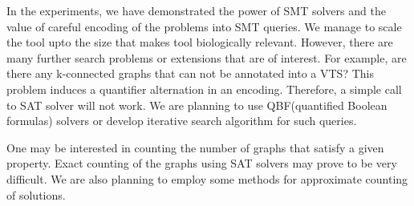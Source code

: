 In the experiments, we have demonstrated the power of SMT solvers and the value
of careful encoding of the problems into SMT queries.
%
We manage to scale the tool upto the size that makes tool
biologically relevant.
%
However, there are many further search problems or extensions
that are of interest.
%
For example, are there any k-connected graphs that can not be
annotated into a VTS?
%
This problem induces a quantifier alternation in an encoding.
%
Therefore, a simple call to SAT solver will not work.
%
We are planning to use QBF(quantified Boolean formulas) solvers or develop
iterative search algorithm for such queries.
%

One may be interested in counting the number of graphs that satisfy
a given property.
%
Exact counting of the graphs using SAT solvers may prove to be very difficult.
%
We are also planning to employ some methods for approximate counting of solutions.






